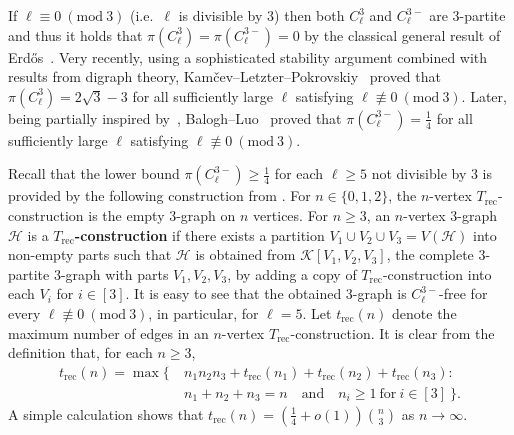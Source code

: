 \documentclass[11pt,a4paper]{article}
\newcommand{\Mod}[1]{\ (\mathrm{mod}\ #1)}
\theoremstyle{remark}
\begin{document}
If $\ell \equiv 0 \Mod{3}$ (i.e.\ $\ell$ is divisible by $3$) then  both $C_{\ell}^{3}$ and $C_{\ell}^{3-}$ are $3$-partite and thus it holds that $\pi(C_{\ell}^{3}) = \pi(C_{\ell}^{3-})=0$ by the classical general result of Erd\H{o}s~\cite{Erd64KST}.
Very recently, using a sophisticated stability argument combined with results from digraph theory, Kam{\v c}ev--Letzter--Pokrovskiy~\cite{KLP24} proved that $\pi(C_{\ell}^{3}) = 2\sqrt{3}-3$ for all sufficiently large $\ell$ satisfying $\ell \not\equiv 0 \Mod{3}$. 
Later, being partially inspired by~\cite{KLP24}, Balogh--Luo~\cite{BL24C5Minus} proved that $\pi(C_{\ell}^{3-}) = \frac{1}{4}$ for all sufficiently large $\ell$ satisfying $\ell \not\equiv 0 \Mod{3}$. 

Recall that the lower bound $\pi(C_{\ell}^{3-})\ge \frac14$ for each $\ell\ge 5$ not divisible by 3 is provided by the following construction from {\cite{MPS11}}. 
For $n \in \{0, 1,2\}$, the $n$-vertex $T_{\mathrm{rec}}$-construction is the empty $3$-graph on $n$ vertices. 
For $n \ge 3$, an $n$-vertex $3$-graph $\mathcal{H}$ is a \textbf{$T_{\mathrm{rec}}$-construction} if there exists a partition $V_1 \cup V_2 \cup V_3 = V(\mathcal{H})$ into non-empty parts such that $\mathcal{H}$ is obtained from $\mathcal{K}[V_1,V_2,V_3]$, the complete $3$-partite $3$-graph with parts $V_1, V_2, V_3$, by adding a copy of $T_{\mathrm{rec}}$-construction into each $V_i$ for $i \in [3]$. It is easy to see that the obtained $3$-graph is $C_{\ell}^{3-}$-free for every $\ell \not\equiv 0 \Mod{3}$, in particular, for $\ell=5$.
Let $t_{\mathrm{rec}}(n)$ denote the maximum number of edges in an $n$-vertex $T_{\mathrm{rec}}$-construction. 
It is clear from the definition that, for each $n\ge 3$,
\begin{align*}
    t_{\mathrm{rec}}(n)
    = \max\big\{ \ & n_1 n_2 n_3 + t_{\mathrm{rec}}(n_1) + t_{\mathrm{rec}}(n_2) + t_{\mathrm{rec}}(n_3): \\
    &  n_1 + n_2 + n_3 = n \quad\text{and}\quad
      n_i \ge 1~\text{for}~i \in [3]\ \big\}. 
\end{align*}
%
A simple calculation  shows that $t_{\mathrm{rec}}(n)= (\frac{1}{4}+o(1)) \binom{n}{3}$ as $n\to\infty$. 
\end{document}
